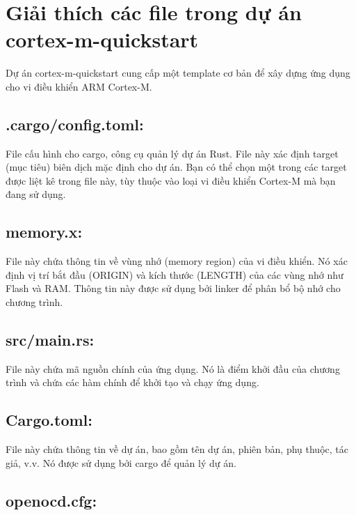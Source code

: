\documentclass[
  letterpaper,
  DIV=11,
  numbers=noendperiod]{scrreprt}
\begin{document}
\section{Giải thích các file trong dự án
cortex-m-quickstart}\label{giux1ea3i-thuxedch-cuxe1c-file-trong-dux1ef1-uxe1n-cortex-m-quickstart}

Dự án cortex-m-quickstart cung cấp một template cơ bản để xây dựng ứng
dụng cho vi điều khiển ARM Cortex-M.

\subsection{.cargo/config.toml:}\label{cargoconfig.toml}

File cấu hình cho cargo, công cụ quản lý dự án Rust. File này xác định
target (mục tiêu) biên dịch mặc định cho dự án. Bạn có thể chọn một
trong các target được liệt kê trong file này, tùy thuộc vào loại vi điều
khiển Cortex-M mà bạn đang sử dụng.

\subsection{memory.x:}\label{memory.x}

File này chứa thông tin về vùng nhớ (memory region) của vi điều khiển.
Nó xác định vị trí bắt đầu (ORIGIN) và kích thước (LENGTH) của các vùng
nhớ như Flash và RAM. Thông tin này được sử dụng bởi linker để phân bổ
bộ nhớ cho chương trình.

\subsection{src/main.rs:}\label{srcmain.rs}

File này chứa mã nguồn chính của ứng dụng. Nó là điểm khởi đầu của
chương trình và chứa các hàm chính để khởi tạo và chạy ứng dụng.

\subsection{Cargo.toml:}\label{cargo.toml}

File này chứa thông tin về dự án, bao gồm tên dự án, phiên bản, phụ
thuộc, tác giả, v.v. Nó được sử dụng bởi cargo để quản lý dự án.

\subsection{openocd.cfg:}\label{openocd.cfg}
\end{document}

